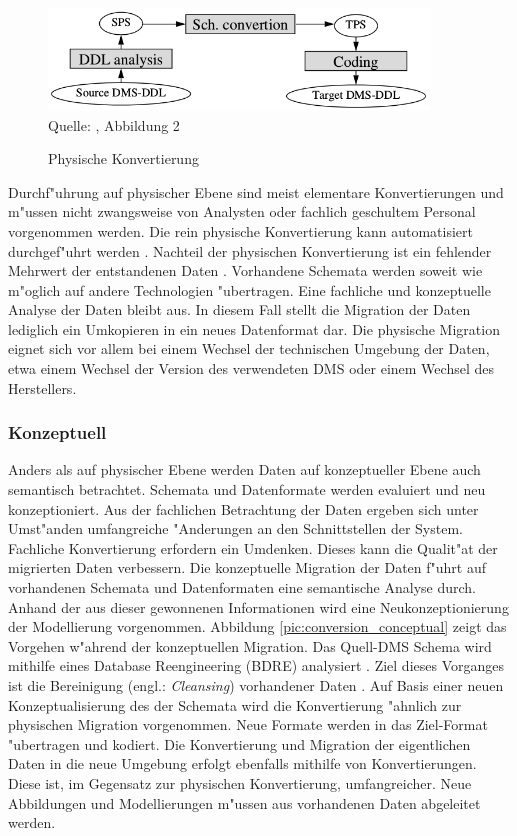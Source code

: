 \begin{figure}[h!]
	\centering
	\caption{Physische Konvertierung}
	\label{pic:conversion_physical}
	\includegraphics[width=0.9\textwidth]{../images/strategies_fig_02a.png} \\
	\tiny Quelle: \citep{henrard-2002}, Abbildung 2
\end{figure}

Durchf"uhrung auf physischer Ebene sind meist elementare Konvertierungen und m"ussen nicht zwangsweise von Analysten oder fachlich geschultem Personal vorgenommen werden. Die rein physische Konvertierung kann automatisiert durchgef"uhrt werden \citep{abiteboul-1999}.
\lb
Nachteil der physischen Konvertierung ist ein fehlender Mehrwert der entstandenen Daten \citep{henrard-2002}. Vorhandene Schemata werden soweit wie m"oglich auf andere Technologien "ubertragen. Eine fachliche und konzeptuelle Analyse der Daten bleibt aus. In diesem Fall stellt die Migration der Daten lediglich ein Umkopieren in ein neues Datenformat dar.
\lb
Die physische Migration eignet sich vor allem bei einem Wechsel der technischen Umgebung der Daten, etwa einem Wechsel der Version des verwendeten DMS oder einem Wechsel des Herstellers. %

\subsubsection{Konzeptuell}

Anders als auf physischer Ebene werden Daten auf konzeptueller Ebene auch semantisch betrachtet. Schemata und Datenformate werden evaluiert und neu konzeptioniert. Aus der fachlichen Betrachtung der Daten ergeben sich unter Umst"anden umfangreiche "Anderungen an den Schnittstellen der System. Fachliche Konvertierung erfordern ein Umdenken. Dieses kann die Qualit"at der migrierten Daten verbessern.
\lb
Die konzeptuelle Migration der Daten f"uhrt auf vorhandenen Schemata und Datenformaten eine semantische Analyse durch. Anhand der aus dieser gewonnenen Informationen wird eine Neukonzeptionierung der Modellierung vorgenommen. Abbildung \ref{pic:conversion_conceptual} zeigt das Vorgehen w"ahrend der konzeptuellen Migration. Das Quell-DMS Schema wird mithilfe eines Database Reengineering (BDRE) analysiert \citep{henrard-2002}. Ziel dieses Vorganges ist die Bereinigung (engl.: \textit{Cleansing}) vorhandener Daten \citep{rahm-2010} \citep{hernandez-1998}. Auf Basis einer neuen Konzeptualisierung des der Schemata wird die Konvertierung "ahnlich zur physischen Migration vorgenommen. Neue Formate werden in das Ziel-Format "ubertragen und kodiert. Die Konvertierung und Migration der eigentlichen Daten in die neue Umgebung erfolgt ebenfalls mithilfe von Konvertierungen. Diese ist, im Gegensatz zur physischen Konvertierung, umfangreicher. Neue Abbildungen und Modellierungen m"ussen aus vorhandenen Daten abgeleitet werden.

